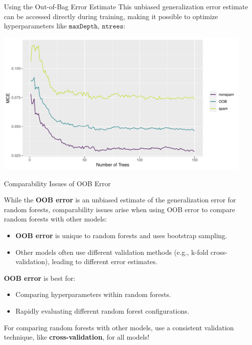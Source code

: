 \documentclass[11pt,compress,t,notes=noshow,xcolor=table]{beamer}
\begin{document}
\begin{vbframe}{Using the Out-of-Bag Error Estimate}
This unbiased generalization error estimate can be accessed directly during training, making it possible to optimize hyperparameters like $\texttt{maxDepth, ntrees}$:

\begin{knitrout}\scriptsize
{}\color{fgcolor}

{\centering \includegraphics[width=0.95\textwidth]{figure/forest-oob.pdf} 

}
\end{knitrout}

\end{vbframe}

\begin{vbframe}{Comparability Issues of OOB Error}

While the \textbf{OOB error} is an unbiased estimate of the generalization error for random forests, comparability issues arise when using OOB error to compare random forests with other models:

\begin{itemize}
\item \textbf{OOB error} is unique to random forests and uses bootstrap sampling.
\item Other models often use different validation methods (e.g., k-fold cross-validation), leading to different error estimates.
\end{itemize}

\textbf{OOB error} is best for:
\begin{itemize}
\item Comparing hyperparameters within random forests.
\item Rapidly evaluating different random forest configurations.
\end{itemize}
For comparing random forests with other models, use a consistent validation technique, like \textbf{cross-validation}, for all models!

\end{vbframe}

\endlecture
\end{document}
